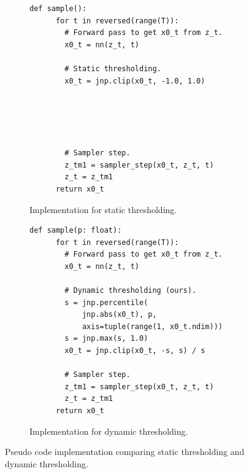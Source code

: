 \clearpage
\begin{figure}
\centering
\begin{subfigure}{.49\textwidth}
  \centering
    \begin{Verbatim}[fontsize=\scriptsize]
    def sample():
      for t in reversed(range(T)):
        # Forward pass to get x0_t from z_t.
        x0_t = nn(z_t, t)
        
        # Static thresholding.
        x0_t = jnp.clip(x0_t, -1.0, 1.0)
        
        
        
        
        
        # Sampler step.
        z_tm1 = sampler_step(x0_t, z_t, t)
        z_t = z_tm1
      return x0_t
    \end{Verbatim}
  \caption{Implementation for static thresholding.}
\end{subfigure}%
\hfill%
\begin{subfigure}{.49\textwidth}
  \centering
  \begin{Verbatim}[fontsize=\scriptsize]
    def sample(p: float):
      for t in reversed(range(T)):
        # Forward pass to get x0_t from z_t.
        x0_t = nn(z_t, t)
        
        # Dynamic thresholding (ours).
        s = jnp.percentile(
            jnp.abs(x0_t), p, 
            axis=tuple(range(1, x0_t.ndim)))
        s = jnp.max(s, 1.0)
        x0_t = jnp.clip(x0_t, -s, s) / s

        # Sampler step.
        z_tm1 = sampler_step(x0_t, z_t, t)
        z_t = z_tm1
      return x0_t
  \end{Verbatim}
  \caption{Implementation for dynamic thresholding.}
\end{subfigure}
\caption{Pseudo code implementation comparing static thresholding and dynamic thresholding.}
\label{fig:clip_vs_scaled_clip_impl}
\end{figure}


